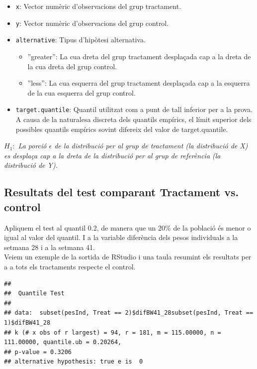 \documentclass[11pt,a4paper]{article}\usepackage[]{graphicx}\usepackage[]{color}
\makeatletter
\newenvironment{kframe}{%
 \def\at@end@of@kframe{}%
 \ifinner\ifhmode%
  \def\at@end@of@kframe{\end{minipage}}%
  \begin{minipage}{\columnwidth}%
 \fi\fi%
 \def\FrameCommand##1{\hskip\@totalleftmargin \hskip-\fboxsep
 \colorbox{shadecolor}{##1}\hskip-\fboxsep
     \hskip-\linewidth \hskip-\@totalleftmargin \hskip\columnwidth}%
 \MakeFramed {\advance\hsize-\width
   \@totalleftmargin\z@ \linewidth\hsize
   \@setminipage}}%
 {\par\unskip\endMakeFramed%
 \at@end@of@kframe}
\newenvironment{knitrout}{}{} %
\makeatother
\begin{document}
\begin{itemize}
  \item \texttt{x}: Vector numèric d'observacions del grup tractament.
  
  \item \texttt{y}: Vector numèric d'observacions del grup control.
  
  \item \texttt{alternative}: Tipus d'hipòtesi alternativa.

\begin{itemize}
      \item ''greater'': La cua dreta del grup tractament desplaçada cap a la dreta de la cua dreta del grup control.
      
      \item ''less'': La cua esquerra del grup tractament desplaçada cap a la esquerra de la cua esquerra del grup control.
\end{itemize}


  \item \texttt{target.quantile}: Quantil utilitzat com a punt de tall inferior per a la prova. A causa de la naturalesa discreta dels quantils empírics, el límit superior dels possibles quantils empírics sovint difereix del valor de target.quantile.

\end{itemize}

\textit{$H_1:$ La porció $\epsilon$ de la distribució per al grup de tractament (la distribució de X) es desplaça cap a la dreta de la distribució per al grup de referència (la distribució de Y).}



\subsection{Resultats del test comparant Tractament vs. control}

Apliquem el test al quantil 0.2, de manera que un 20\% de la població és menor o igual al valor del quantil. I a la variable diferència dels pesos individuals a la setmana 28 i a la setmana 41.\\

Veiem un exemple de la sortida de RStudio i una taula resumint els resultats per a a tots els tractaments respecte el control.
\begin{knitrout}
\color{fgcolor}\begin{kframe}
\begin{verbatim}
## 
## 	Quantile Test
## 
## data:  subset(pesInd, Treat == 2)$difBW41_28subset(pesInd, Treat == 1)$difBW41_28
## k (# x obs of r largest) = 94, r = 181, m = 115.00000, n = 111.00000, quantile.ub = 0.20264,
## p-value = 0.3206
## alternative hypothesis: true e is  0
\end{verbatim}
\end{kframe}
\end{knitrout}
\end{document}
